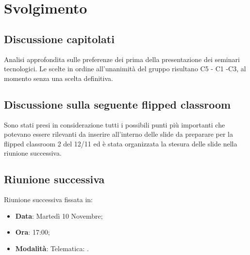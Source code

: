\documentclass[]{article}
\begin{document}
	\newpage

	\section{Svolgimento}
		\subsection{Discussione capitolati}
		 Analisi approfondita sulle preferenze dei  prima della presentazione dei seminari tecnologici. Le scelte in ordine all'unanimità del gruppo risultano C5 - C1 -C3, al momento senza una scelta definitiva.\\
	
		\subsection{Discussione sulla seguente flipped classroom}
		Sono stati presi in considerazione tutti i possibili punti più importanti che potevano essere rilevanti da inserire all'interno delle slide da preparare per la flipped classroom 2  del 12/11 ed è stata organizzata la stesura delle slide nella riunione successiva.\\
		
		\subsection{Riunione successiva}
		Riunione successiva fissata in:
		\begin{itemize}
			\item \textbf{Data}: Martedì 10 Novembre;
			\item \textbf{Ora}: 17:00;
			\item \textbf{Modalità}: Telematica: .
		\end{itemize}
\end{document}
